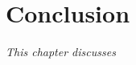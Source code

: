 \chapter{Conclusion}
\label{p2_chap:conclusion}
\textit{This chapter discusses}
\vspace{2ex}\vfill
\minitoc
\newpage



